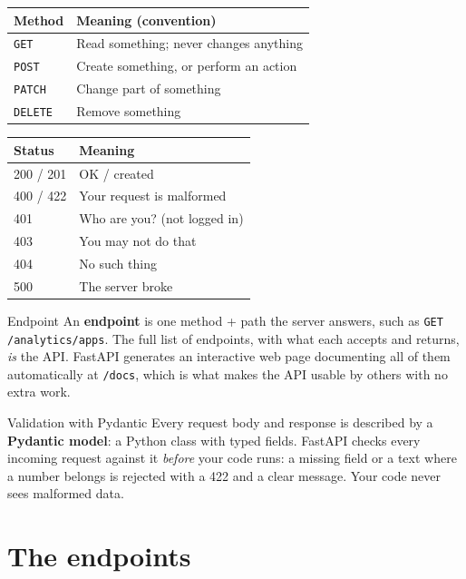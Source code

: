 \documentclass[11pt,a4paper]{article}
\begin{document}
\begin{center}
\renewcommand{\arraystretch}{1.2}
\begin{tabularx}{\textwidth}{l X}
\toprule
\textbf{Method} & \textbf{Meaning (convention)} \\
\midrule
\texttt{GET}    & Read something; never changes anything \\
\texttt{POST}   & Create something, or perform an action \\
\texttt{PATCH}  & Change part of something \\
\texttt{DELETE} & Remove something \\
\bottomrule
\end{tabularx}
\quad
\begin{tabular}{ll}
\toprule
\textbf{Status} & \textbf{Meaning} \\
\midrule
200 / 201 & OK / created \\
400 / 422 & Your request is malformed \\
401 & Who are you? (not logged in) \\
403 & You may not do that \\
404 & No such thing \\
500 & The server broke \\
\bottomrule
\end{tabular}
\end{center}

\begin{concept}{Endpoint}
An \textbf{endpoint} is one method + path the server answers, such as
\texttt{GET /analytics/apps}. The full list of endpoints, with what each accepts and returns,
\emph{is} the API. FastAPI generates an interactive web page documenting all of them
automatically at \texttt{/docs}, which is what makes the API usable by others with no extra work.
\end{concept}

\begin{concept}{Validation with Pydantic}
Every request body and response is described by a \textbf{Pydantic model}: a Python class with
typed fields. FastAPI checks every incoming request against it \emph{before} your code runs:
a missing field or a text where a number belongs is rejected with a 422 and a clear message.
Your code never sees malformed data.
\end{concept}

\section{The endpoints}
\end{document}
